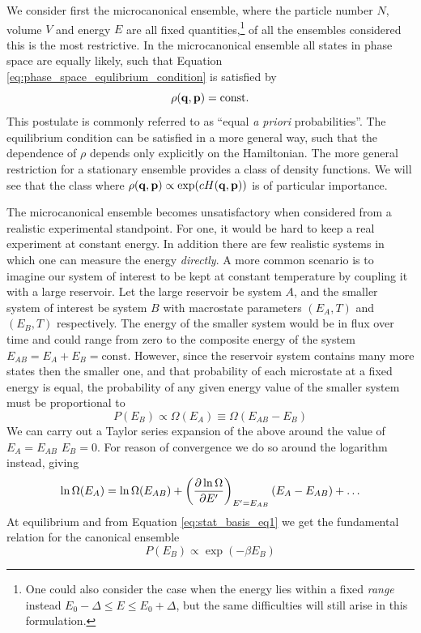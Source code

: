 We consider first the microcanonical ensemble, where the particle number $N$, volume $V$ and energy $E$ are all fixed quantities,\footnote{One could also consider the case when the energy lies within a fixed \textit{range} instead $E_0 -\Delta \le E \le E_0 +\Delta$, but the same difficulties will still arise in this formulation.} of all the ensembles considered this is the most restrictive. In the microcanonical ensemble all states in phase space are equally likely, such that Equation \ref{eq:phase_space_equlibrium_condition} is satisfied by
\begin{equation}
  \rho ({\bf q},{\bf p}) = \text{const.}
\end{equation}
This postulate is commonly referred to as ``equal \textit{a priori} probabilities''. The equilibrium condition can be satisfied in a more general way, such that the dependence of $\rho$ depends only explicitly on the Hamiltonian. The more general restriction for a stationary ensemble provides a class of density functions. We will see that the class where $\rho ({\bf q},{\bf p}) \propto \exp ( c H ({\bf q},{\bf p}) )$  is of particular importance.

The microcanonical ensemble becomes unsatisfactory when considered from a realistic experimental standpoint. For one, it would be hard to keep a real experiment at constant energy. In addition there are few realistic systems in which one can measure the energy \textit{directly}. A more common scenario is to imagine our system of interest to be kept at constant temperature by coupling it with a large reservoir. Let the large reservoir be system $A$, and the smaller system of interest be system $B$ with macrostate parameters $(E_A, T)$ and $(E_B, T)$ respectively. The energy of the smaller system would be in flux over time and could range from zero to the composite energy of the system $E_{AB} = E_A + E_B = \text{const}$. However, since the reservoir system contains many more states then the smaller one, and that probability of each microstate at a fixed energy is equal, the probability of any given energy value of the smaller system must be proportional to
\begin{equation}
  P(E_B) \propto \Omega(E_A) \equiv \Omega(E_{AB} - E_B)
\end{equation}
We can carry out a Taylor series expansion of the above around the value of $E_A = E_{AB}$ \ie $E_B=0$. For reason of convergence we do so around the logarithm instead, giving
\begin{equation}
  \ln \Omega (E_A) = \ln \Omega(E_{AB}) + 
  \left( 
    \frac{\partial \ln \Omega}{\partial E'}
   \right)
  _ {E' = E_{AB}}
  (E_A - E_{AB}) 
  + \ldots
\end{equation}
At equilibrium and from Equation \ref{eq:stat_basis_eq1} we get the fundamental relation for the canonical ensemble
\begin{equation}
  P(E_B) \propto \exp (-\beta E_B)
  \label{eq:cannonical_prob_unnormal}
\end{equation}


